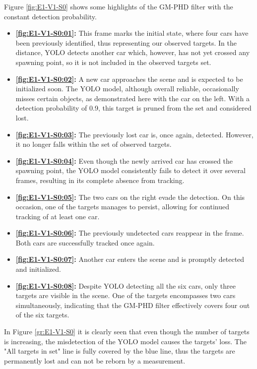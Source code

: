 Figure \ref{fig:E1-V1-S0} shows some highlights of the GM-PHD filter with the constant detection probability.
\begin{itemize}
    \item \textbf{\ref{fig:E1-V1-S0:01}:} This frame marks the initial state, where four cars have been previously
    identified, thus representing our observed targets. In the distance, YOLO detects another car which, however,
    has not yet crossed any spawning point, so it is not included in the observed targets set.
    \item \textbf{\ref{fig:E1-V1-S0:02}:} A new car approaches the scene and is expected to be initialized soon. The
    YOLO model, although overall reliable, occasionally misses certain objects, as demonstrated here with the
    car on the left. With a detection probability of 0.9, this target is pruned from the set and considered lost.
    \item \textbf{\ref{fig:E1-V1-S0:03}:} The previously lost car is, once again, detected. However, it no longer
    falls within the set of observed targets.
    \item \textbf{\ref{fig:E1-V1-S0:04}:} Even though the newly arrived car has crossed the spawning point, the YOLO model
    consistently
    fails to detect it over several frames, resulting in its complete absence from tracking.
    \item \textbf{\ref{fig:E1-V1-S0:05}:} The two cars on the right evade the detection. On this occasion, one
    of the targets manages to persist, allowing for continued tracking of at least one car.
    \item \textbf{\ref{fig:E1-V1-S0:06}:} The previously undetected cars reappear in the frame. Both cars are
    successfully tracked once again.
    \item \textbf{\ref{fig:E1-V1-S0:07}:} Another car enters the scene and is promptly detected and initialized.
    \item \textbf{\ref{fig:E1-V1-S0:08}:} Despite YOLO detecting all the six cars, only three targets are visible in the
    scene. One of the targets encompasses two cars simultaneously, indicating that the GM-PHD filter effectively covers four out of the six targets.
\end{itemize}

In Figure \ref{gr:E1-V1-S0} it is clearly seen that even though the number of targets is increasing, the misdetection
of the YOLO model causes the targets' loss. The "All targets in set" line is fully covered by the blue line, thus the
targets are permanently lost and can not be reborn by a measurement.

